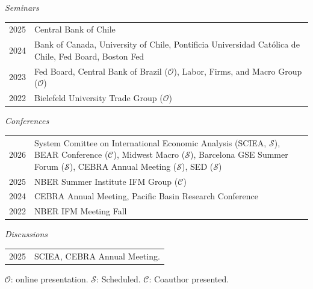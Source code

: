 \documentclass[10pt]{article}
\begin{document}
\noindent 
\emph{Seminars}\\[0.1in]
\begin{tabular}{@{}p{1.8cm}p{13cm}}
2025 & Central Bank of Chile\\
2024& Bank of Canada, University of Chile, Pontificia Universidad Cat\'olica de Chile, Fed Board, Boston Fed\\
2023& Fed Board, Central Bank of Brazil ($\mathcal{O}$), Labor, Firms, and Macro Group ($\mathcal{O}$)\\
2022& Bielefeld University Trade Group ($\mathcal{O}$)%
\end{tabular}

\noindent \emph{Conferences}\\[0.1in]
\begin{tabular}{@{}p{1.8cm}p{13cm}}
2026 & System Comittee on International Economic Analysis (SCIEA, $\mathcal{S}$), BEAR Conference ($\mathcal{C}$), Midwest Macro ($\mathcal{S}$), Barcelona GSE Summer Forum ($\mathcal{S}$), CEBRA Annual Meeting ($\mathcal{S}$), SED ($\mathcal{S}$)\\
2025 & NBER Summer Institute IFM Group ($\mathcal{C}$)\\
2024 & CEBRA Annual Meeting, Pacific Basin Research Conference\\
2022& NBER IFM Meeting Fall
\end{tabular}

\noindent \emph{Discussions}\\[0.1in]
\begin{tabular}{@{}p{1.8cm}p{13cm}}
2025 & SCIEA, CEBRA Annual Meeting.
\end{tabular}


{\footnotesize $\mathcal{O}$: online presentation. $\mathcal{S}$: Scheduled. $\mathcal{C}$: Coauthor presented.}
\end{document}
